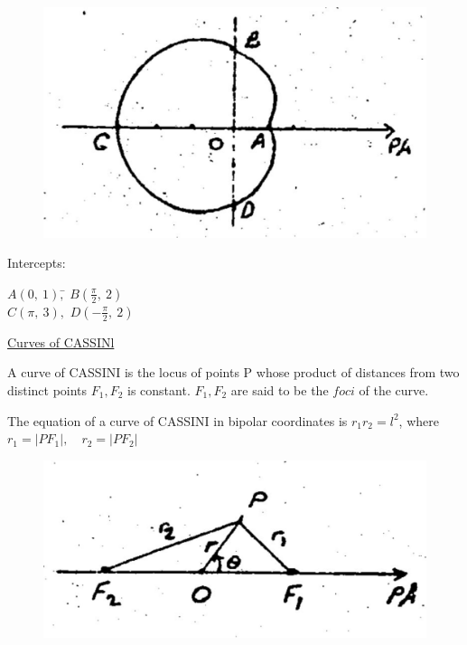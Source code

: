 \documentclass[11pt]{amsbook}
\begin{document}


\begin{figure}
	\vspace{-20pt}
	\includegraphics[width=0.8\linewidth]{images/b1p2-318-fig01}
	\vspace{-80pt}
\end{figure}

Intercepts:
\begin{tabbing}
	$A(0,~1),$\quad \quad      \=     $B(\frac{\pi}{2},~2)$\\
	$C(\pi,~3),$     \>     $ D(-\frac{\pi}{2},~2)$\\ 
\end{tabbing}

\underline{Curves of CASSINl}\par
A curve of CASSINI is the locus of points P whose product of distances from two distinct points $F_{1}, F_{2}$ is constant. $F_{1}, F_{2}$ are said to be the $foci$ of the curve.\par
The equation of a curve of CASSINI in bipolar coordinates is $r_{1}r_{2} = l^{2}$, where $r_{1} = |PF_{1}|,\quad r_{2} = |PF_{2}|$\par

\begin{figure}
	\vspace{-25pt}
	\includegraphics[width=0.9\linewidth]{images/b1p2-318-fig02}
\end{figure}
\end{document}
